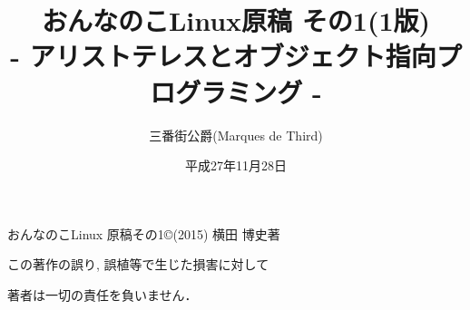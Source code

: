 \documentclass[uplatex,b5j,8pt, twocolumn]{jsarticle}
\title{おんなのこLinux原稿 その1(1版)\\
{- アリストテレスとオブジェクト指向プログラミング -}}
\author{三番街公爵(Marques de Third)}
\date{
平成27年11月28日 
 }
\begin{document}
\maketitle

おんなのこLinux 原稿その1\copyright (2015) 横田 博史著\par

この著作の誤り, 誤植等で生じた損害に対して

著者は一切の責任を負いません．

\newpage
\setcounter{page}{1}


\end{document}
